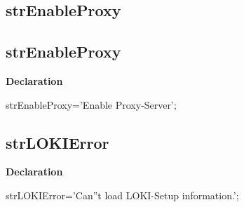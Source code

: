 \documentclass{report}
\newif\ifpdf
\begin{document}
\subsection*{\large{\textbf{strEnableProxy}}\normalsize\hspace{1ex}\hrulefill}
\else
\subsection*{strEnableProxy}
\fi
\label{trstrings-strEnableProxy}
\begin{list}{}{
\setlength{\itemindent}{0cm}
\setlength{\listparindent}{0cm}
\setlength{\leftmargin}{\evensidemargin}
\addtolength{\leftmargin}{\tmplength}
\settowidth{\labelsep}{X}
\addtolength{\leftmargin}{\labelsep}
\setlength{\labelwidth}{\tmplength}
}
\item[\textbf{Declaration}\hfill]
\ifpdf
\begin{flushleft}
\fi
\begin{ttfamily}
strEnableProxy='Enable Proxy-Server';\end{ttfamily}

\ifpdf
\end{flushleft}
\fi

\end{list}
\ifpdf
\subsection*{\large{\textbf{strLOKIError}}\normalsize\hspace{1ex}\hrulefill}
\else
\subsection*{strLOKIError}
\fi
\label{trstrings-strLOKIError}
\begin{list}{}{
\setlength{\itemindent}{0cm}
\setlength{\listparindent}{0cm}
\setlength{\leftmargin}{\evensidemargin}
\addtolength{\leftmargin}{\tmplength}
\settowidth{\labelsep}{X}
\addtolength{\leftmargin}{\labelsep}
\setlength{\labelwidth}{\tmplength}
}
\item[\textbf{Declaration}\hfill]
\ifpdf
\begin{flushleft}
\fi
\begin{ttfamily}
strLOKIError='Can''t load LOKI-Setup information.';\end{ttfamily}

\ifpdf
\end{flushleft}
\fi

\end{list}
\ifpdf
\end{document}
